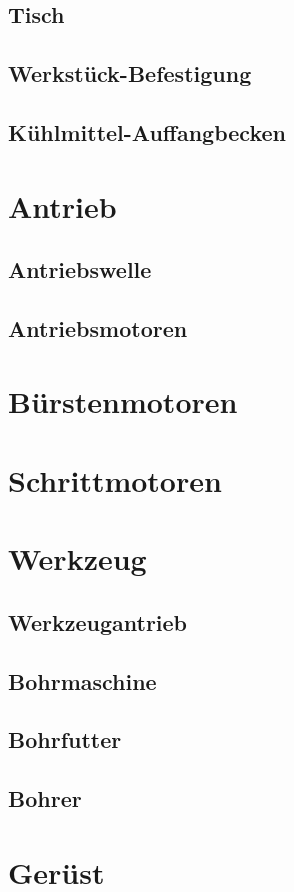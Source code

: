 \documentclass[
	a4paper,
	smallheadings,
	german,
	]
	{scrreprt}
\begin{document}
	\subsection{Tisch}
	\subsection{Werkstück-Befestigung}
	\subsection{Kühlmittel-Auffangbecken}
\section{Antrieb}
	\subsection{Antriebswelle}
	\subsection{Antriebsmotoren}
		\section{Bürstenmotoren}
		\section{Schrittmotoren}
\section{Werkzeug}
	\subsection{Werkzeugantrieb}
	\subsection{Bohrmaschine}
		\subsection{Bohrfutter}
		\subsection{Bohrer}
\section{Gerüst}
\end{document}
